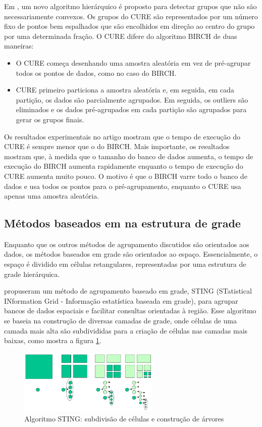Em \cite{Guha1998}, um novo algoritmo hierárquico é proposto para detectar grupos que não são necessariamente convexos. Os grupos do CURE são representados por um número fixo de pontos bem espalhados que são encolhidos em direção ao centro do grupo por uma determinada fração. O CURE difere do algoritmo BIRCH de duas maneiras:
\begin{itemize}
\item O CURE começa desenhando uma amostra aleatória em vez de pré-agrupar todos os pontos de dados, como no caso do BIRCH.
\item CURE primeiro particiona a amostra aleatória e, em seguida, em cada partição, os dados são parcialmente agrupados. Em seguida, os outliers são eliminados e os dados pré-agrupados em cada partição são agrupados para gerar os grupos finais.
\end{itemize}
Os resultados experimentais no artigo mostram que o tempo de execução do CURE é sempre menor que o do BIRCH. Mais importante, os resultados mostram que, à medida que o tamanho do banco de dados aumenta, o tempo de execução do BIRCH aumenta rapidamente enquanto o tempo de execução do CURE aumenta muito pouco. O motivo é que o BIRCH varre todo o banco de dados e usa todos os pontos para o pré-agrupamento, enquanto o CURE usa apenas uma amostra aleatória.

\subsection{Métodos baseados em na estrutura de grade}
Enquanto que os outros métodos de agrupamento discutidos são orientados aos dados, os métodos baseados em grade são orientados ao espaço. Essencialmente, o espaço é dividido em células retangulares, representadas por uma estrutura de grade hierárquica.

\cite{Wang1997} propuseram um método de agrupamento baseado em grade, STING (STatistical INformation Grid - Informação estatística baseada em grade), para agrupar bancos de dados espaciais e facilitar consultas orientadas à região. Esse algoritmo se baseia na construção de diversas camadas de grade, onde células de uma camada mais alta são subdivididas para a criação de células nas camadas mais baixas, como mostra a figura \ref{fig:sting}.

\begin{figure}[!h]
	\centering
	\includegraphics[width=0.6\textwidth]{figuras/sting.png}
	\caption{Algoritmo STING: subdivisão de células e construção de árvores}
	\label{fig:sting}
\end{figure}

